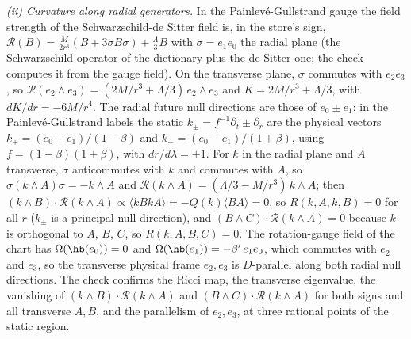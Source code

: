 \emph{(ii) Curvature along radial generators.} In the Painlev\'e-Gullstrand gauge the field strength of the Schwarzschild-de Sitter field is, in the store's sign, $\mathcal{R}(B) = \tfrac{M}{2r^{3}}(B + 3\sigma B\sigma) + \tfrac{\Lambda}{3}B$ with $\sigma = e_{1}e_{0}$ the radial plane (the Schwarzschild operator of the dictionary plus the de Sitter one; the check computes it from the gauge field). On the transverse plane, $\sigma$ commutes with $e_{2}e_{3}$, so $\mathcal{R}(e_{2}\wedge e_{3}) = (2M/r^{3} + \Lambda/3)\,e_{2}\wedge e_{3}$ and $K = 2M/r^{3} + \Lambda/3$, with $dK/dr = -6M/r^{4}$. The radial future null directions are those of $e_{0} \pm e_{1}$: in the Painlev\'e-Gullstrand labels the static $k_{\pm} = f^{-1}\partial_{t} \pm \partial_{r}$ are the physical vectors $k_{+} = (e_{0} + e_{1})/(1 - \beta)$ and $k_{-} = (e_{0} - e_{1})/(1 + \beta)$, using $f = (1 - \beta)(1 + \beta)$, with $dr/d\lambda = \pm 1$. For $k$ in the radial plane and $A$ transverse, $\sigma$ anticommutes with $k$ and commutes with $A$, so $\sigma(k\wedge A)\sigma = -k\wedge A$ and $\mathcal{R}(k\wedge A) = (\Lambda/3 - M/r^{3})\,k\wedge A$; then $(k\wedge B)\cdot\mathcal{R}(k\wedge A) \propto \langle kBkA\rangle = -Q(k)\langle BA\rangle = 0$, so $R(k, A, k, B) = 0$ for all $r$ ($k_{\pm}$ is a principal null direction), and $(B\wedge C)\cdot\mathcal{R}(k\wedge A) = 0$ because $k$ is orthogonal to $A$, $B$, $C$, so $R(k, A, B, C) = 0$. The rotation-gauge field of the chart has $\Omega(\hb(e_{0})) = 0$ and $\Omega(\hb(e_{1})) = -\beta'\,e_{1}e_{0}$, which commutes with $e_{2}$ and $e_{3}$, so the transverse physical frame $e_{2}, e_{3}$ is $D$-parallel along both radial null directions. The check confirms the Ricci map, the transverse eigenvalue, the vanishing of $(k\wedge B)\cdot\mathcal{R}(k\wedge A)$ and $(B\wedge C)\cdot\mathcal{R}(k\wedge A)$ for both signs and all transverse $A, B$, and the parallelism of $e_{2}, e_{3}$, at three rational points of the static region.

